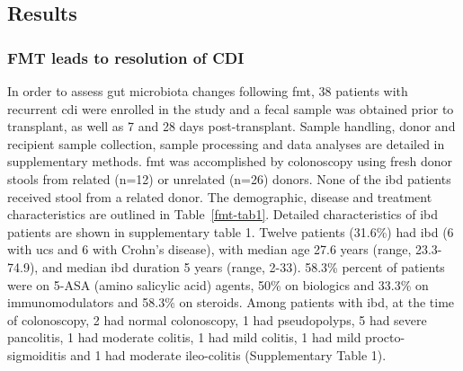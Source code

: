 \subsection{Results}

\subsubsection{FMT leads to resolution of CDI}
In order to assess gut microbiota changes following \gls{fmt}, 38 patients with recurrent \gls{cdi} were enrolled in the study and a fecal sample was obtained prior to transplant, as well as 7 and 28 days post-transplant. Sample handling, donor and recipient sample collection, sample processing and data analyses are detailed in supplementary methods. \gls{fmt} was accomplished by colonoscopy using fresh donor stools from related (n=12) or unrelated (n=26) donors. None of the \gls{ibd} patients received stool from a related donor. The demographic, disease and treatment characteristics are outlined in Table~\ref{fmt-tab1}. Detailed characteristics of \gls{ibd} patients are shown in supplementary table 1. Twelve patients (31.6\%) had \gls{ibd} (6 with \glspl{uc} and 6 with Crohn's disease), with median age 27.6 years (range, 23.3-74.9), and median \gls{ibd} duration 5 years (range, 2-33). 58.3\% percent of patients were on 5-ASA (amino salicylic acid) agents, 50\% on biologics and 33.3\% on immunomodulators and 58.3\% on steroids.  Among patients with \gls{ibd}, at the time of colonoscopy, 2 had normal colonoscopy, 1 had pseudopolyps, 5 had severe pancolitis, 1 had moderate colitis, 1 had mild colitis, 1 had mild procto-sigmoiditis and 1 had moderate ileo-colitis (Supplementary Table 1).

